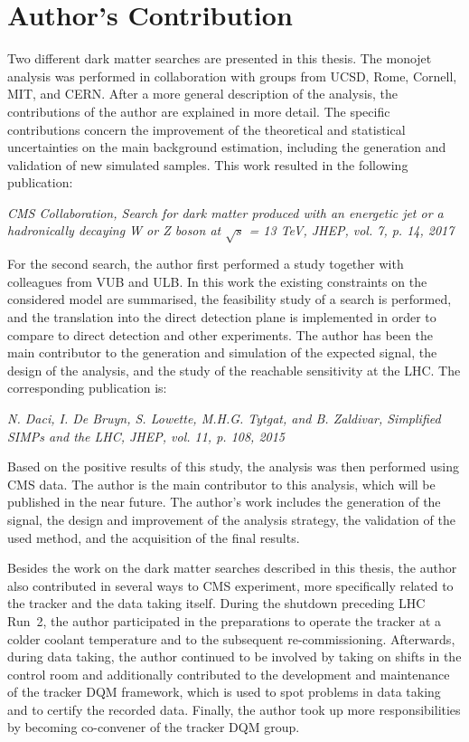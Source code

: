 \chapter*{Author's Contribution}

Two different dark matter searches are presented in this thesis. The monojet analysis was performed in collaboration with groups from UCSD, Rome, Cornell, MIT, and CERN. After a more general description of the analysis, the contributions of the author are explained in more detail. The specific contributions concern the improvement of the theoretical and statistical uncertainties on the main background estimation, including the generation and validation of new simulated samples. This work resulted in the following publication:

\begin{center}
\textit{CMS Collaboration, Search for dark matter produced with an energetic jet or a hadronically decaying W or Z boson at $\sqrt{s}$ = 13 TeV, JHEP, vol. 7, p. 14, 2017}
\end{center}

For the second search, the author first performed a study together with colleagues from VUB and ULB. In this work the existing constraints on the considered model are summarised, the feasibility study of a search is performed, and the translation into the direct detection plane is implemented in order to compare to direct detection and other experiments. The author has been the main contributor to the generation and simulation of the expected signal, the design of the analysis, and the study of the reachable sensitivity at the \acs{LHC}. The corresponding publication is:

\begin{center}
\textit{N. Daci, I. De Bruyn, S. Lowette, M.H.G. Tytgat, and B. Zaldivar, Simplified SIMPs and the LHC, JHEP, vol. 11, p. 108, 2015}
\end{center}

Based on the positive results of this study, the analysis was then performed using CMS data. The author is the main contributor to this analysis, which will be published in the near future. The author's work includes the generation of the signal, the design and improvement of the analysis strategy, the validation of the used method, and the acquisition of the final results.


Besides the work on the dark matter searches described in this thesis, the author also contributed in several ways to \acs{CMS} experiment, more specifically related to the tracker and the data taking itself. During the shutdown preceding \acs{LHC} Run~2, the author participated in the preparations to operate the tracker at a colder coolant temperature and to the subsequent re-commissioning. Afterwards, during data taking, the author continued to be involved by taking on shifts in the control room and additionally contributed to the development and maintenance of the tracker \acf{DQM} framework, which is used to spot problems in data taking and to certify the recorded data. Finally, the author took up more responsibilities by becoming co-convener of the tracker \acs{DQM} group.